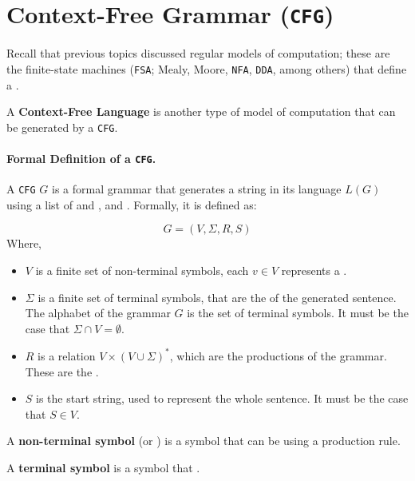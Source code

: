 \section{Context-Free Grammar (\texttt{CFG})}
\label{cfg_chapter}

Recall that previous topics discussed regular models of computation; these are the finite-state machines (\texttt{FSA}; Mealy, Moore, \texttt{NFA}, \texttt{DDA}, among others) that define a .

A \textbf{Context-Free Language} is another type of model of computation that can be generated by a \texttt{CFG}.

\paragraph{Formal Definition of a \texttt{CFG}.}  A \texttt{CFG} $G$ is a formal grammar that generates a string in its language $L(G)$ using a list of  and , and . Formally, it is defined as:

    \[
    G=\left(V,\Sigma, R,S\right)
    \]
    Where,
    \begin{itemize}
        \item $V$ is a finite set of non-terminal symbols, each $v\in V$ represents a .
        \item $\Sigma$ is a finite set of terminal symbols, that are the   of the generated sentence. The alphabet of the grammar $G$ is the set of terminal symbols. It must be the case that $\Sigma \cap V=\emptyset$.
        \item $R$ is a relation $V\times (V\cup\Sigma)^*$, which are the productions of the grammar. These are the .
        \item $S$ is the start string, used to represent the whole sentence. It must be the case that $S\in V$.
    \end{itemize}

\begin{defn}
    A \textbf{non-terminal symbol} (or ) is a symbol that can be  using a production rule.
\end{defn}

\begin{defn}
    A \textbf{terminal symbol} is a symbol that .
\end{defn}

